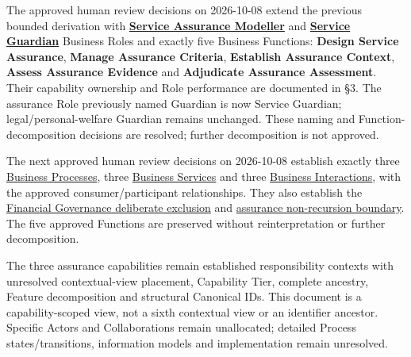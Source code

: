 \label{rad:assurance:9}

The approved human review decisions on 2026-10-08 extend the previous bounded derivation with \textbf{\href{https://github.com/fhirfactory/harmonia/blob/98410db60155198a75f74c79d98060070209faa1/docs/markdown/03-business-architecture/actors-roles/roles.md\#service-assurance-modeller}{Service Assurance Modeller}} and \textbf{\href{https://github.com/fhirfactory/harmonia/blob/98410db60155198a75f74c79d98060070209faa1/docs/markdown/03-business-architecture/actors-roles/roles.md\#service-guardian}{Service Guardian}} Business Roles and exactly five Business Functions: \textbf{Design Service Assurance}, \textbf{Manage Assurance Criteria}, \textbf{Establish Assurance Context}, \textbf{Assess Assurance Evidence} and \textbf{Adjudicate Assurance Assessment}. Their capability ownership and Role performance are documented in §3. The assurance Role previously named Guardian is now Service Guardian; legal/\allowbreak{}personal-welfare Guardian remains unchanged. These naming and Function-decomposition decisions are resolved; further decomposition is not approved.

\label{rad:assurance:11}

The next approved human review decisions on 2026-10-08 establish exactly three \hyperref[rad:processes:349]{Business Processes}, three \hyperref[rad:assurance:156]{Business Services} and three \href{https://github.com/fhirfactory/harmonia/blob/98410db60155198a75f74c79d98060070209faa1/docs/markdown/03-business-architecture/collaborations-interactions/interactions.md\#5-approved-service-assurance-interactions}{Business Interactions}, with the approved consumer/\allowbreak{}participant relationships. They also establish the \href{https://github.com/fhirfactory/harmonia/blob/98410db60155198a75f74c79d98060070209faa1/docs/markdown/03-business-architecture/behaviours/health-service-assurance.md\#financial-governance-exclusion}{Financial Governance deliberate exclusion} and \href{https://github.com/fhirfactory/harmonia/blob/98410db60155198a75f74c79d98060070209faa1/docs/markdown/03-business-architecture/behaviours/health-service-assurance.md\#assurance-non-recursion-boundary}{assurance non-recursion boundary}. The five approved Functions are preserved without reinterpretation or further decomposition.

\label{rad:assurance:13}

The three assurance capabilities remain established responsibility contexts with unresolved contextual-view placement, Capability Tier, complete ancestry, Feature decomposition and structural Canonical IDs. This document is a capability-scoped view, not a sixth contextual view or an identifier ancestor. Specific Actors and Collaborations remain unallocated; detailed Process states/\allowbreak{}transitions, information models and implementation remain unresolved.

